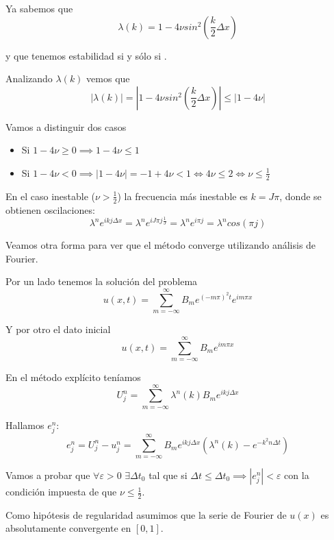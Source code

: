 Ya sabemos que 
$$\lambda(k) = 1-4\nu sin^2(\frac{k}{2}\Delta x)$$ 

y que tenemos estabilidad si y sólo si . 

Analizando $\lambda(k)$ vemos que
$$|\lambda(k)| = \left|1-4\nu sin^2\left(\frac{k}{2}\Delta x\right)\right|\le \left|1-4\nu\right|$$

Vamos a distinguir dos casos
\begin{itemize}
	\item Si $1-4\nu\ge 0 \implies 1-4\nu \le 1$
	\item Si $1-4\nu < 0\implies |1-4\nu| = -1+4\nu < 1 \iff 4\nu \le 2 \iff \nu \le \frac{1}{2}$ 
\end{itemize}

En el caso inestable ($\nu > \frac{1}{2}$) la frecuencia más inestable es $k = J\pi$, donde se obtienen oscilaciones:
$$\lambda^n e^{ikj\Delta x} = \lambda^n e^{iJ\pi j\frac{1}{J}} = \lambda^n e^{i\pi j} = \lambda^n cos(\pi j)$$

Veamos otra forma para ver que el método converge utilizando análisis de Fourier.

Por un lado tenemos la solución del problema
\begin{equation*}
		u(x,t)  =  \sum_{m=-\infty}^{\infty} B_m e^{(-m\pi)^2t}e^{im\pi x}
\end{equation*}

Y por otro el dato inicial
\begin{equation*}
	u(x,t)  =  \sum_{m=-\infty}^{\infty} B_m e^{im\pi x}
\end{equation*}

En el método explícito teníamos
\begin{equation*}
	U_j^n  =  \sum_{m=-\infty}^{\infty} \lambda^n(k)B_m e^{ik j\Delta x}
\end{equation*}

Hallamos $e_j^n$:
\begin{equation*}
	e_j^n = U_j^n - u_j^n =  \sum_{m=-\infty}^{\infty} B_m e^{ik j\Delta x}\left(\lambda^n(k) - e^{-k^2n\Delta t}\right)
\end{equation*}

Vamos a probar que $\forall \varepsilon > 0$ $\exists \Delta t_0$ tal que si $\Delta t \le \Delta t_0 \implies |e_j^n| < \varepsilon$ con la condición impuesta de que $\nu\le\frac{1}{2}$.

Como hipótesis de regularidad asumimos que la serie de Fourier de $u(x)$ es absolutamente convergente en $[0,1]$.

